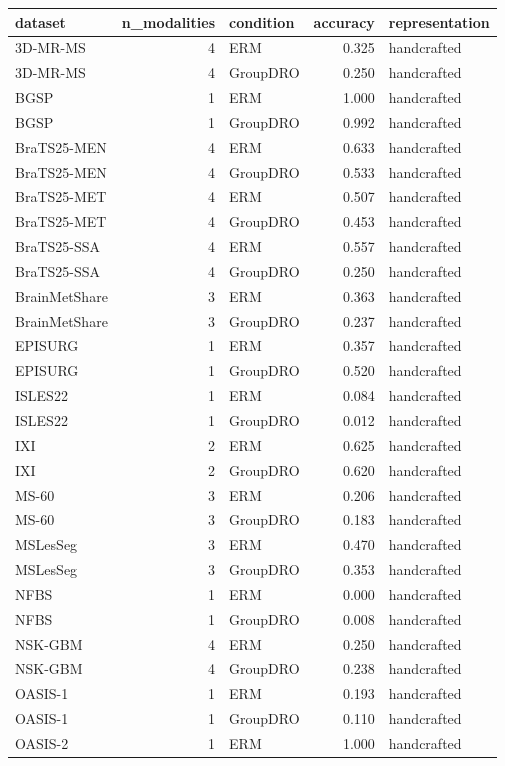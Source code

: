 \begin{tabular}{lrlrl}
\toprule
dataset & n\_modalities & condition & accuracy & representation \\
\midrule
3D-MR-MS & 4 & ERM & 0.325 & handcrafted \\
3D-MR-MS & 4 & GroupDRO & 0.250 & handcrafted \\
BGSP & 1 & ERM & 1.000 & handcrafted \\
BGSP & 1 & GroupDRO & 0.992 & handcrafted \\
BraTS25-MEN & 4 & ERM & 0.633 & handcrafted \\
BraTS25-MEN & 4 & GroupDRO & 0.533 & handcrafted \\
BraTS25-MET & 4 & ERM & 0.507 & handcrafted \\
BraTS25-MET & 4 & GroupDRO & 0.453 & handcrafted \\
BraTS25-SSA & 4 & ERM & 0.557 & handcrafted \\
BraTS25-SSA & 4 & GroupDRO & 0.250 & handcrafted \\
BrainMetShare & 3 & ERM & 0.363 & handcrafted \\
BrainMetShare & 3 & GroupDRO & 0.237 & handcrafted \\
EPISURG & 1 & ERM & 0.357 & handcrafted \\
EPISURG & 1 & GroupDRO & 0.520 & handcrafted \\
ISLES22 & 1 & ERM & 0.084 & handcrafted \\
ISLES22 & 1 & GroupDRO & 0.012 & handcrafted \\
IXI & 2 & ERM & 0.625 & handcrafted \\
IXI & 2 & GroupDRO & 0.620 & handcrafted \\
MS-60 & 3 & ERM & 0.206 & handcrafted \\
MS-60 & 3 & GroupDRO & 0.183 & handcrafted \\
MSLesSeg & 3 & ERM & 0.470 & handcrafted \\
MSLesSeg & 3 & GroupDRO & 0.353 & handcrafted \\
NFBS & 1 & ERM & 0.000 & handcrafted \\
NFBS & 1 & GroupDRO & 0.008 & handcrafted \\
NSK-GBM & 4 & ERM & 0.250 & handcrafted \\
NSK-GBM & 4 & GroupDRO & 0.238 & handcrafted \\
OASIS-1 & 1 & ERM & 0.193 & handcrafted \\
OASIS-1 & 1 & GroupDRO & 0.110 & handcrafted \\
OASIS-2 & 1 & ERM & 1.000 & handcrafted \\

\end{tabular}
